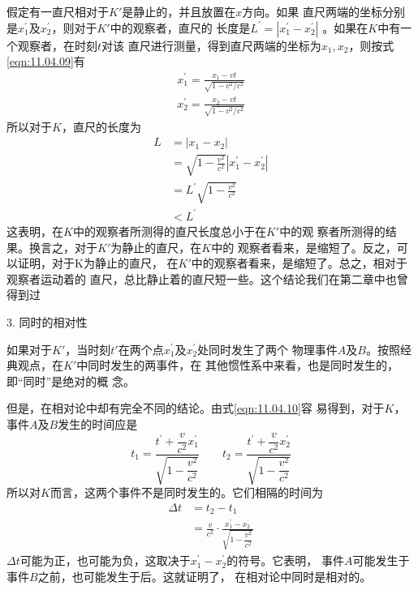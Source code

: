 \documentclass[../outline-of-mechanics.tex]{subfiles}
\begin{document}
假定有一直尺相对于$ K ' $是静止的，并且放置在$ x $方向。如果
直尺两端的坐标分别是$ x _ 1 ^ { \prime } $及$ x _ 2 ^ { \prime } $，则对于$ K ' $中的观察者，直尺的
长度是$ L ^ { \prime } = | x _ { 1 } ^ { \prime } - x _ { 2 } ^ { \prime } | $ 。如果在$ K $中有一个观察者，在时刻$ t $对该
直尺进行测量，得到直尺两端的坐标为$ x _ 1, x _ 2 $，则按式 \eqref{eqn:11.04.09}有
\begin{align*}
  x _ { 1 } ^ { \prime } = \frac { x _ { 1 } - v t } { \sqrt { 1 - v ^ { 2 } / c ^ { 2 } } } \\
  x _ { 2 } ^ { \prime } = \frac { x _ { 2 } - v t } { \sqrt { 1 - v ^ { 2 } / c ^ { 2 } } }
\end{align*}
所以对于$ K $，直尺的长度为
\begin{equation}\label{eqn:11.05.02}
  \begin{split}
    L &= | x _ { 1 } - x _ { 2 } | \\
    &= \sqrt { 1 - \frac { v ^ { 2 } } { c ^ { 2 } } } | x _ { 1 } ^ { \prime } - x _ { 2 } ^ { \prime } | \\
    &= L ^ { \prime } \sqrt { 1 - \frac { v ^ { 2 } } { c ^ { 2 } } } \\
    &< L ^ { \prime }
  \end{split}
\end{equation}
这表明，在$ K $中的观察者所测得的直尺长度总小于在$ K ' $中的观
察者所测得的结果。换言之，对于$ K ' $为静止的直尺，在$ K $中的
观察者看来，是缩短了。反之，可以证明，对于K为静止的直尺，
在$ K ' $中的观察者看来，是缩短了。总之，相对于观察者运动着的
直尺，总比静止着的直尺短一些。这个结论我们在第二章中也曾
得到过

\textsf{3. 同时的相对性}

如果对于$ K ' $，当时刻$ t ' $在两个点$ x _ { 1 } ^ { \prime } $及$ x _ { 2 } ^ { \prime } $处同时发生了两个
物理事件$ A $及$ B $。按照经典观点，在$ K ' $中同时发生的两事件，在
其他惯性系中来看，也是同时发生的，即“同时”是绝对的概
念。

但是，在相对论中却有完全不同的结论。由式\eqref{eqn:11.04.10}容
易得到，对于$ K $，事件$ A $及$ B $发生的时间应是
\begin{equation*}
  t_{1}=\frac{t^{\prime}+\dfrac{v}{c^{2}} x_{1}^{\prime}}{\sqrt{1-\dfrac{v^{2}}{c^{2}}}}
  \qquad
  t_{2}=\frac{t^{\prime}+\dfrac{v}{c^{2}} x_{2}^{\prime}}{\sqrt{1-\dfrac{v^{2}}{c^{2}}}}
\end{equation*}
所以对$ K $而言，这两个事件不是同时发生的。它们相隔的时间为
\begin{equation}\label{eqn:11.05.03}
  \begin{aligned}
    \Delta t & =t_{2}-t_{1}                                                                               \\
             & =\frac{v}{c^{2}} \cdot \frac{x_{1}^{\prime}-x_{2}^{\prime}}{\sqrt{1-\dfrac{v^{2}}{c^{2}}}}
  \end{aligned}
\end{equation}
$ \Delta t $可能为正，也可能为负，这取决于$ x_{1}^{\prime}-x_{2}^{\prime} $的符号。它表明，
事件$ A $可能发生于事件$ B $之前，也可能发生于后。这就证明了，
在相对论中同时是相对的。
\end{document}
